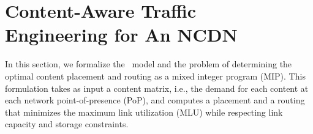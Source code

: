 

\eat
{
\section{Content-Aware Traffic\\ Engineering for An NCDN}
\label{sec:optimize}


In this section, we formalize the \ncp\ model and the problem of determining the optimal content placement and routing as a mixed integer program (MIP).  This formulation takes as input a content matrix, i.e., the demand for each content at each network point-of-presence (PoP), and  computes a placement and a routing that minimizes the maximum link utilization (MLU) while respecting link capacity and storage constraints.
}










